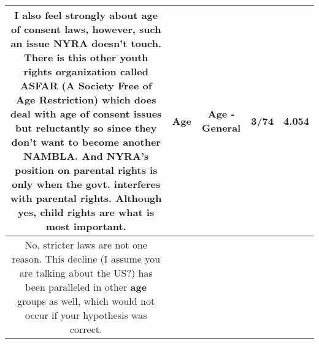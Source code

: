 \documentclass[11pt]{article}
\newlength\mylength
\begin{document}
\begin{center}
\begin{longtable}{|C{.65\mylength}|C{.30\mylength}|C{.12\mylength}|C{.12\mylength}|C{.12\mylength}|}
  \small I also feel strongly about \textbf{age} of consent laws, however, such an issue NYRA doesn't touch. There is this other youth rights organization called ASFAR (A Society Free of \textbf{Age} Restriction) which does deal with \textbf{age} of consent issues but reluctantly so since they don't want to become another NAMBLA. And NYRA's position on parental rights is only when the govt. interferes with parental rights. Although yes, child rights are what is most important.\normalsize   & Age & Age - General & 3/74 & 4.054 \\  \hline
  \small {}  No, stricter laws are not one reason. This decline (I assume you are talking about the US?) has been paralleled in other \textbf{age} groups as well, which would not occur if your hypothesis was correct.


\end{longtable}
\end{center}
\end{document}
